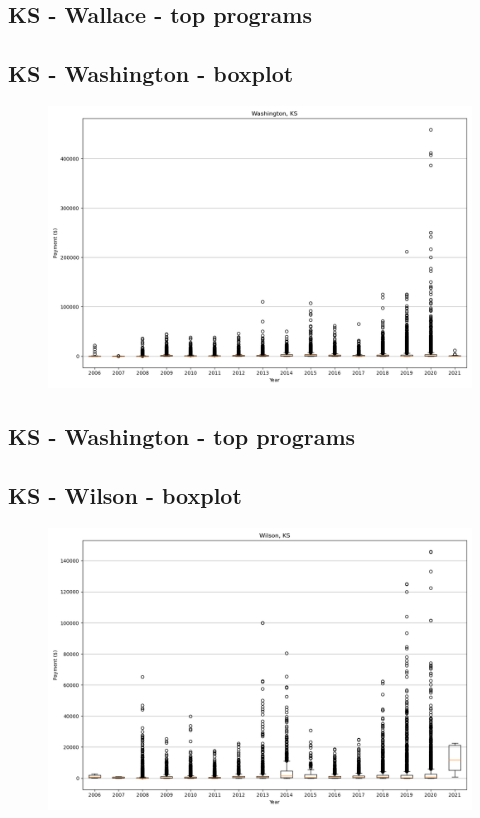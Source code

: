 \subsection*{KS - Wallace - top programs}

\newpage
\subsection*{KS - Washington - boxplot}
\begin{figure}[h]
\centering
\includegraphics[width=7in]{../output/boxplots/counties/Washington-KS_boxplot.png}
\end{figure}


\subsection*{KS - Washington - top programs}

\newpage
\subsection*{KS - Wilson - boxplot}
\begin{figure}[h]
\centering
\includegraphics[width=7in]{../output/boxplots/counties/Wilson-KS_boxplot.png}
\end{figure}


